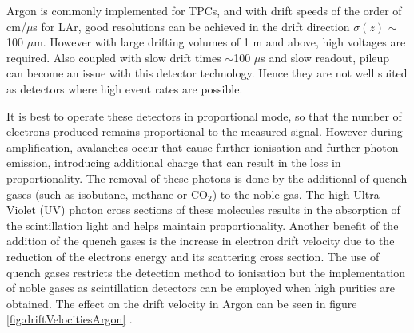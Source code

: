 Argon is commonly implemented for TPCs, and with drift speeds of the order of cm/$\mu$s for LAr, good resolutions can be achieved in the drift direction $\sigma(z)$ $\sim$100 $\mu$m. However with large drifting volumes of 1 m and above, high voltages are required. Also coupled with slow drift times $\sim$100 $\mu$s and slow readout, pileup can become an issue with this detector technology. Hence they are not well suited as detectors where high event rates are possible.

It is best to operate these detectors in proportional mode, so that the number of electrons produced remains proportional to the measured signal. However during amplification, avalanches occur that cause further ionisation and further photon emission, introducing additional charge that can result in the loss in proportionality. The removal of these photons is done by the additional of quench gases (such as isobutane, methane or CO$_{2}$) to the noble gas. The high Ultra Violet (UV) photon cross sections of these molecules results in the absorption of the scintillation light and helps maintain proportionality. Another benefit of the addition of the quench gases is the increase in electron drift velocity due to the reduction of the electrons energy and its scattering cross section. The use of quench gases restricts the detection method to ionisation but the implementation of noble gases as scintillation detectors can be employed when high purities are obtained. The effect on the drift velocity in Argon can be seen in figure \ref{fig:driftVelocitiesArgon} \cite{gasDetectors}.

